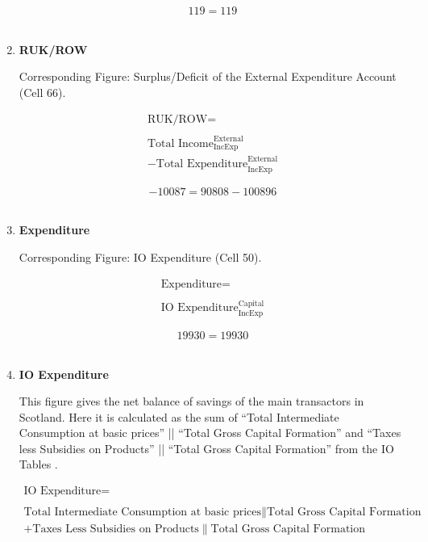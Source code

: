 \begin{enumerate}
\begin{equation} \nonumber
119 = 119
\end{equation}\\


\item \textbf {RUK/ROW}

Corresponding Figure: Surplus/Deficit of the External Expenditure Account (Cell 66).

\begin{equation}
\begin{split}
\text{RUK/ROW} =  \\ \\
\text{Total Income}^\text{External}_\text{IncExp}\\
-\text{Total Expenditure}^\text{External}_\text{IncExp}
\end{split} \label{eq:2.5.52}
\end{equation}

\begin{equation} \nonumber
-10087 = 90808-100896
\end{equation}\\


\item \textbf {Expenditure}

Corresponding Figure: IO Expenditure (Cell 50).
    
\begin{equation}
\begin{split}
\text{Expenditure} =  \\ \\
\text{IO Expenditure}^\text{Capital}_\text{IncExp}
\end{split} \label{eq:2.5.53}
\end{equation}

\begin{equation} \nonumber
19930 = 19930
\end{equation}\\

\newpage

\item \textbf {IO Expenditure}

This figure gives the net balance of savings of the main transactors in Scotland. Here it is calculated as the sum of ``Total Intermediate Consumption at basic prices'' || ``Total Gross Capital Formation'' and ``Taxes less Subsidies on Products'' || ``Total Gross Capital Formation'' from the IO Tables \cite{ScotGov2013a}.

\begin{equation}
\begin{split}
\text{IO Expenditure} =  \\ \\
\text{Total Intermediate Consumption at basic prices}\|\text{Total Gross Capital Formation}\\
+\text{Taxes Less Subsidies on Products}\|\text{Total Gross Capital Formation}\\
\end{split} \label{eq:2.5.54}
\end{equation}


\end{enumerate}
